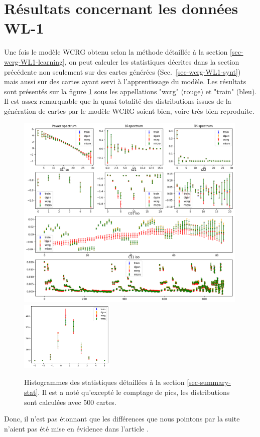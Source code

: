\documentclass[12pt,twoside]{article}
\begin{document}
\section{Résultats concernant les données WL-1}
\label{sec-WL1-res}
%
Une fois le modèle WCRG obtenu selon la méthode détaillée à la section \ref{sec-wcrg-WL1-learning}, on peut calculer les statistiques décrites dans la section précédente non seulement sur des cartes générées (Sec.~\ref{sec-wcrg-WL1-synt}) mais aussi sur des cartes ayant servi à l'apprentissage du modèle. Les résultats sont présentés sur la figure \ref{fig-WL1-summary-stat} sous les appellations "wcrg" (rouge) et "train" (bleu). Il est assez remarquable que la quasi totalité des distributions issues de la génération de cartes par le modèle WCRG soient bien, voire très bien reproduite. 
\begin{figure}
\centering
\includegraphics[width=0.99\textwidth]{fig-WL1-summary-stat.png}\\
\includegraphics[width=0.4\textwidth]{fig-WL1-peak-count.png}
\caption{Histogrammes des statistiques détaillées à la section \ref{sec-summary-stat}. Il est a noté qu'excepté le comptage de pics, les distributions sont calculées avec 500 cartes.}
\label{fig-WL1-summary-stat}
\end{figure}
Donc, il n'est pas étonnant que les différences que nous pointons par la suite n'aient pas été mise en évidence dans l'article \citep{2023arXiv230600181G}.
\end{document}
